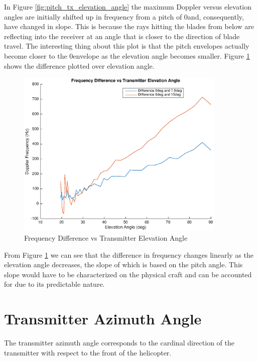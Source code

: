 In Figure \ref{fig:pitch_tx_elevation_angle} the maximum Doppler versus elevation angles are initially shifted up in frequency from a pitch of 0\textdegree \space and, consequently, have changed in slope. This is because the rays hitting the blades from below are reflecting into the receiver at an angle that is closer to the direction of blade travel. The interesting thing about this plot is that the pitch envelopes actually become closer to the 0\textdegree \space envelope as the elevation angle becomes smaller. Figure \ref{fig:pitch_tx_elevation_angle_difference} shows the difference plotted over elevation angle.

\begin{figure}
	\begin{center}
		\includegraphics[width=10cm]{images/simulation/elevation_angle_with_pitch_max_doppler_Difference.eps}
		\caption{Frequency Difference vs Transmitter Elevation Angle}
		\label{fig:pitch_tx_elevation_angle_difference}
	\end{center}
\end{figure}

From Figure \ref{fig:pitch_tx_elevation_angle_difference} we can see that the difference in frequency changes linearly as the elevation angle decreases, the slope of which is based on the pitch angle. This slope would have to be characterized on the physical craft and can be accounted for due to its predictable nature.

\section{Transmitter Azimuth Angle} \label{taa}
The transmitter azimuth angle corresponds to the cardinal direction of the transmitter with respect to the front of the helicopter.

